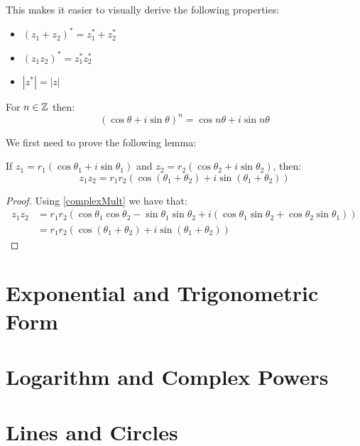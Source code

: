 \documentclass[../main.tex]{subfiles}
\begin{document}
This makes it easier to visually derive the following properties:
\begin{itemize}
  \item $(z_1 + z_2)^{*} = z^{*}_{1} + z^{*}_{2}$
  \item $(z_1 z_2)^{*} = z^{*}_{1} z^{*}_{2}$
  \item $|z^{*}| = |z|$
\end{itemize}
\begin{theorem}
  For $n \in \mathbb{Z}$ then:
  \[
    (\cos \theta + i \sin \theta)^n = \cos n\theta + i \sin n\theta
  \] 
\end{theorem}
We first need to prove the following lemma:
\begin{lemma}
  If $z_1 = r_1(\cos \theta_1 + i \sin \theta_1)$ and $z_2 = r_2(\cos \theta_2 + i \sin \theta_2)$, then:
  \[
    z_1 z_2 = r_1 r_2 (\cos (\theta_1 + \theta_2) + i\sin(\theta_1 + \theta_2))
  \]
\end{lemma}
\begin{proof}
  Using \cref{complexMult} we have that:
  \begin{align*}
    z_1 z_2 &= r_1 r_2 (\cos \theta_1 \cos \theta_2 - \sin \theta_1 \sin \theta_2 + i(\cos \theta_1 \sin \theta_2 + \cos \theta_2 \sin \theta_1)) \\
            &= r_1 r_2 (\cos(\theta_1 + \theta_2) + i\sin(\theta_1 + \theta_2))
  \end{align*} 
\end{proof}
\section{Exponential and Trigonometric Form}
\section{Logarithm and Complex Powers}
\section{Lines and Circles}
\end{document}
